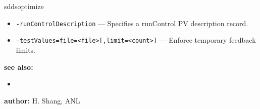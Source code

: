 \begin{sddsprog}{sddsoptimize}
\begin{itemize}
        \item {\tt -runControlDescription} --- Specifies a runControl PV description record.
        \item {\tt -testValues=file=<file>[,limit=<count>]} --- Enforce temporary feedback limits.
  \end{itemize}
\item \textbf{see also:}
    \begin{itemize}
    \item {}
    \end{itemize}
\item \textbf{author:} H. Shang, ANL
\end{sddsprog}
